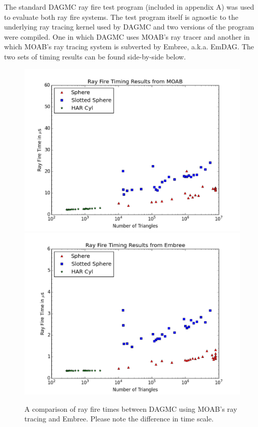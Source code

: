 \documentclass[10pt, a4paper]{article}
\begin{document}
The standard DAGMC ray fire test program (included in appendix A) was used to evaluate both ray fire systems. The test program itself is agnostic to the underlying ray tracing kernel used by DAGMC and two versions of the program were compiled. One in which DAGMC uses MOAB's ray tracer and another in which MOAB's ray tracing system is subverted by Embree, a.k.a. EmDAG. The two sets of timing results can be found side-by-side below.

\begin{figure}
  \centering
  \includegraphics[scale=0.2]{Eig_fix_rf.png}
  \includegraphics[scale=0.2]{embree_rf.png}
  \caption{A comparison of ray fire times between DAGMC using MOAB's ray tracing and Embree. Please note the difference in time scale.}
\end{figure}
\end{document}
